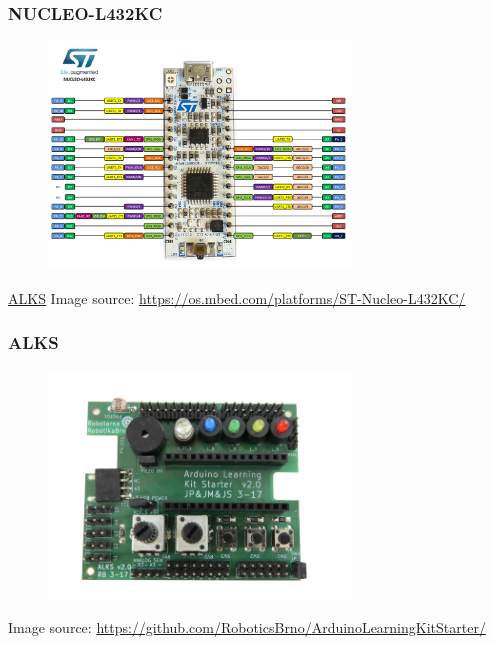 \documentclass[12;pt,t]{beamer} %
\newcommand{\srctext}[1]{{\fontsize{7}{9}\selectfont\textcolor{sourcesclr}{#1}}}
\begin{document}
\begin{frame}
\frametitle{NUCLEO-L432KC}
	
	\begin{figure}[H]
		\includegraphics[width=0.72\textwidth]{img/nucleo_l432kc_2017_10_09.png}
	\end{figure}
	
	\href{https://github.com/RoboticsBrno/ArduinoLearningKitStarter/wiki}{ALKS}
	\srctext{Image source: \url{https://os.mbed.com/platforms/ST-Nucleo-L432KC/}}
\end{frame}

\begin{frame}
\frametitle{ALKS}

	\begin{figure}[H]
		\includegraphics[width=0.72\textwidth]{img/ALKS_v2_0_3_00_top_white_background.png}
	\end{figure}
	
	\srctext{Image source: \url{https://github.com/RoboticsBrno/ArduinoLearningKitStarter/}}
\end{frame}
\end{document}
